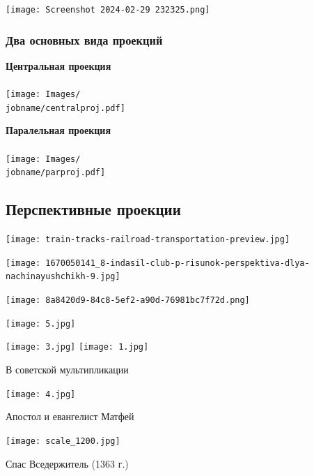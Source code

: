 \documentclass[10pt]{beamer}
\begin{document}
	{
		\centering
		\texttt{[image: Screenshot 2024-02-29 232325.png]}
	}
	

    \begin{frame}
    	\frametitle{Два основных вида проекций}
    	
    	{
    		\centering
    		
    		\textbf{Центральная проекция} \\ ~ \\
    		
    		\texttt{[image: Images/\\jobname/centralproj.pdf]}
    	}
    	{
    		\centering
    		
    		\textbf{Паралельная проекция}  \\ ~ \\
    		
    		\texttt{[image: Images/\\jobname/parproj.pdf]}
    	}
    	
    	
    \end{frame}
    
    \subsection{Перспективные проекции}
    
    {
    	\centering
    	\texttt{[image: train-tracks-railroad-transportation-preview.jpg]}
    }
    
    {
    	\centering
    	\texttt{[image: 1670050141\_8-indasil-club-p-risunok-perspektiva-dlya-nachinayushchikh-9.jpg]}
    }
    
   
    
    {
    	\centering
    	\texttt{[image: 8a8420d9-84c8-5ef2-a90d-76981bc7f72d.png]}
    }
    
    {
    	
    	\centering
    	\texttt{[image: 5.jpg]}
    }
    
    {
    	{
    		\centering
    		\texttt{[image: 3.jpg]}
    	}
    	{
    		\centering
    		\texttt{[image: 1.jpg]}
    	} 	
    	
    	\centering 
    	
    	В советской мультипликации
    }
    
    {
    	{
    		\centering
    		\texttt{[image: 4.jpg]}
    		
    		Апостол и евангелист Матфей
    	}
    	{
    		\centering
    		\texttt{[image: scale\_1200.jpg]}
    		
    		Спас Вседержитель (1363 г.)
    	} 	
    }
    
\end{document}
